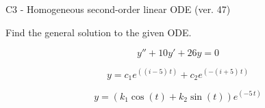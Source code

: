 \begin{exercise}
  \begin{exerciseTitle}C3 - Homogeneous second-order linear ODE (ver. 47)\end{exerciseTitle}
  \begin{exerciseStatement}
    
Find the general solution to the given ODE.

    
\[y''+10y'+26y = 0\]

  \end{exerciseStatement}
  \begin{exerciseAnswer}
    
\[y= c_{1} e^{\left(\left(i - 5\right) \, t\right)} + c_{2} e^{\left(-\left(i + 5\right) \, t\right)}\]

    
\[y= {\left(k_{1} \cos\left(t\right) + k_{2} \sin\left(t\right)\right)} e^{\left(-5 \, t\right)}\]

  \end{exerciseAnswer}
\end{exercise}